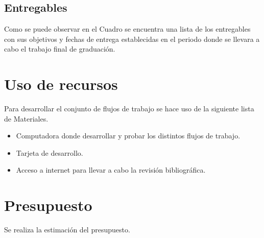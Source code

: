 \documentclass[12pt]{article}
\begin{document}
\newpage



\subsection{Entregables}

Como se puede observar en el Cuadro se encuentra una lista de los entregables con sus objetivos y fechas de entrega establecidas en el periodo donde se llevara a cabo el trabajo final de graduación.



\section{Uso de recursos}

Para desarrollar el conjunto de flujos de trabajo se hace uso de la siguiente lista de Materiales.

\begin{itemize}
  \item Computadora donde desarrollar y probar los distintos flujos de trabajo.
  \item Tarjeta de desarrollo.
  \item Acceso a internet para llevar a cabo la revisión bibliográfica.
\end{itemize}

\newpage

\section{Presupuesto}

Se realiza la estimación del presupuesto. 


\newpage



\end{document}
